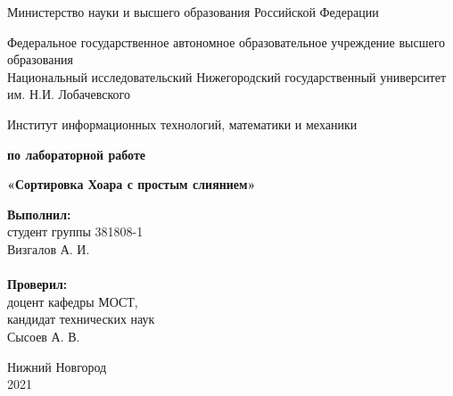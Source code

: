 \documentclass{report}
\begin{document}
\begin{titlepage}

\begin{center}
Министерство науки и высшего образования Российской Федерации
\end{center}

\begin{center}
Федеральное государственное автономное образовательное учреждение высшего образования \\
Национальный исследовательский Нижегородский государственный университет им. Н.И. Лобачевского
\end{center}

\begin{center}
Институт информационных технологий, математики и механики
\end{center}

\vspace{4em}

\begin{center}
\textbf{ по лабораторной работе} \\
\end{center}
\begin{center}
\textbf{\Large«Сортировка Хоара с простым слиянием»} \\
\end{center}

\vspace{4em}

\newbox{\lbox}
\newlength{\maxl}
\setlength{\maxl}{\wd\lbox}
\hfill\parbox{7cm}{
\hspace*{5cm}\hspace*{-5cm}\textbf{Выполнил:} \\ студент группы 381808-1 \\ Визгалов А. И.\\
\\
\hspace*{5cm}\hspace*{-5cm}\textbf{Проверил:}\\ доцент кафедры МОСТ, \\ кандидат технических наук \\ Сысоев А. В.\\
}
\vspace{\fill}

\begin{center} Нижний Новгород \\ 2021 \end{center}

\end{titlepage}
\end{document}
